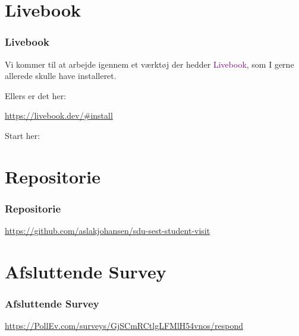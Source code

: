 \section{Livebook}
\begin{frame}
    \frametitle{Livebook}
    \vspace{5mm}
    Vi kommer til at arbejde igennem et værktøj der hedder \textcolor{purple}{Livebook}, som I gerne allerede skulle have installeret.
    
    \vspace{7mm}
    Ellers er det her:
    \begin{center}
      \url{https://livebook.dev/\#install}
    \end{center}
    
    \vspace{7mm}
    Start her:
    \begin{center}
    \end{center}
\end{frame}

\section{Repositorie}
\begin{frame}
    \frametitle{Repositorie}
    \begin{center}
    
      \vspace{4mm}
      \url{https://github.com/aslakjohansen/sdu-sest-student-visit}
    \end{center}
\end{frame}

\section{Afsluttende Survey}
\begin{frame}
    \frametitle{Afsluttende Survey}
    \begin{center}
    
      \vspace{4mm}
      \url{https://PollEv.com/surveys/GjSCmRCtlgLFMlH54vnos/respond}
    \end{center}
\end{frame}

